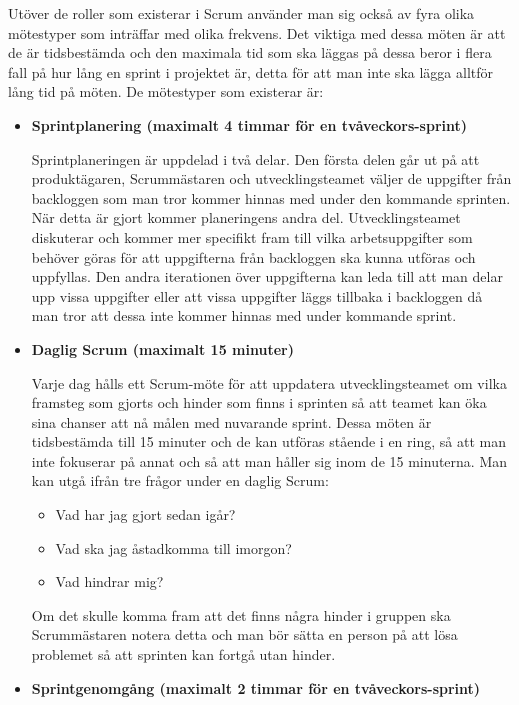 Utöver de roller som existerar i Scrum använder man sig också av fyra olika mötestyper som inträffar med olika frekvens. Det viktiga med dessa möten är att de är tidsbestämda och den maximala tid som ska läggas på dessa beror i flera fall på hur lång en sprint i projektet är, detta för att man inte ska lägga alltför lång tid på möten. De mötestyper som existerar är:

\begin{itemize}
	\item \textbf{Sprintplanering (maximalt 4 timmar för en tvåveckors-sprint)}
	
	Sprintplaneringen är uppdelad i två delar. Den första delen går ut på att produktägaren, Scrummästaren och utvecklingsteamet väljer de uppgifter från backloggen som man tror kommer hinnas med under den kommande sprinten. När detta är gjort kommer planeringens andra del. Utvecklingsteamet diskuterar och kommer mer specifikt fram till vilka arbetsuppgifter som behöver göras för att uppgifterna från backloggen ska kunna utföras och uppfyllas. Den andra iterationen över uppgifterna kan leda till att man delar upp vissa uppgifter eller att vissa uppgifter läggs tillbaka i backloggen då man tror att dessa inte kommer hinnas med under kommande sprint.
	
	\item \textbf{Daglig Scrum (maximalt 15 minuter)}
	
	Varje dag hålls ett Scrum-möte för att uppdatera utvecklingsteamet om vilka framsteg som gjorts och hinder som finns i sprinten så att teamet kan öka sina chanser att nå målen med nuvarande sprint. Dessa möten är tidsbestämda till 15 minuter och de kan utföras stående i en ring, så att man inte fokuserar på annat och så att man håller sig inom de 15 minuterna. Man kan utgå ifrån tre frågor under en daglig Scrum:
	
	\begin{itemize}
		\item Vad har jag gjort sedan igår?
		\item Vad ska jag åstadkomma till imorgon?
		\item Vad hindrar mig?
	\end{itemize}
	
	Om det skulle komma fram att det finns några hinder i gruppen ska Scrummästaren notera detta och man bör sätta en person på att lösa problemet så att sprinten kan fortgå utan hinder.
	
	\item \textbf{Sprintgenomgång (maximalt 2 timmar för en tvåveckors-sprint)}
	

\end{itemize}
